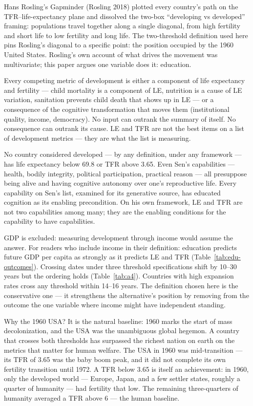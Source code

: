 \documentclass[12pt,letterpaper]{article}
\begin{document}
Hans Rosling's Gapminder (Rosling 2018) plotted every country's
path on the TFR--life-expectancy plane and dissolved the two-box
``developing vs developed'' framing: populations travel together
along a single diagonal, from high fertility and short life to low
fertility and long life. The two-threshold definition used here pins Rosling's
diagonal to a specific point: the position occupied by the 1960
United States. Rosling's own account of what drives the movement was
multivariate; this paper argues one variable does it: education.

Every competing metric of development is either a component of life
expectancy and fertility --- child mortality is a component of LE,
nutrition is a cause of LE variation, sanitation prevents child death
that shows up in LE --- or a consequence of the cognitive
transformation that moves them (institutional quality, income,
democracy). No input can outrank the summary of itself. No consequence
can outrank its cause. LE and TFR are not the best items on a list of
development metrics --- they are what the list is measuring.

No country considered developed --- by any definition, under any
framework --- has life expectancy below 69.8 or TFR above 3.65. Even
Sen's capabilities --- health, bodily integrity, political
participation, practical reason --- all presuppose being alive and
having cognitive autonomy over one's reproductive life. Every
capability on Sen's list, examined for its generative source, has
educated cognition as its enabling precondition. On his own
framework, LE and TFR are not two capabilities among many; they are
the enabling conditions for the capability to have capabilities.

GDP is excluded: measuring development through income would assume
the answer. For readers who include income in their definition:
education predicts future GDP per capita as strongly as it predicts
LE and TFR (Table~\ref{tab:edu-outcomes}). Crossing dates under three threshold
specifications shift by 10--30 years but the ordering holds
(Table~\ref{tab:a4}). Countries with high expansion rates cross any
threshold within 14--16 years. The definition chosen here is the
conservative one --- it strengthens the alternative's position by
removing from the outcome the one variable where income might have
independent standing.

Why the 1960 USA? It is the natural baseline: 1960 marks the start of
mass decolonization, and the USA was the unambiguous global hegemon.
A country that crosses both thresholds has surpassed the richest
nation on earth on the metrics that matter for human welfare. The
USA in 1960 was mid-transition --- its TFR of 3.65 was the baby boom
peak, and it did not complete its own fertility transition until
1972. A TFR below 3.65 is itself an achievement: in 1960, only the
developed world --- Europe, Japan, and a few settler states, roughly
a quarter of humanity --- had fertility that low. The remaining
three-quarters of humanity averaged a TFR above 6 --- the human
baseline.
\end{document}
